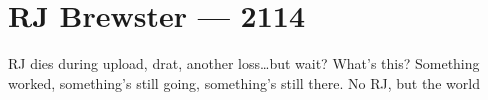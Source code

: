 \hypertarget{rj-brewster-2114}{%
\chapter{RJ Brewster — 2114}\label{rj-brewster-2114}}

RJ dies during upload, drat, another loss\ldots but wait? What's this? Something worked, something's still going, something's still there. No RJ, but the world
